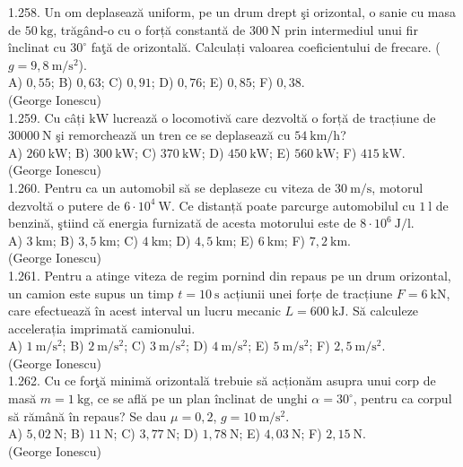 {1.258. Un om deplasează uniform, pe un drum drept şi orizontal, o sanie cu masa de $50 \mathrm{~kg}$, trăgând-o cu o forță constantă de $300 \mathrm{~N}$ prin intermediul unui fir înclinat cu $30^{\circ}$ faţă de orizontală. Calculați valoarea coeficientului de frecare. ($g=9,8 \mathrm{~m} / \mathrm{s}^{2}$).\\ A) $0,55$; B) $0,63$; C) $0,91$; D) $0,76$; E) $0,85$; F) $0,38$.\\ (George Ionescu)\\

1.259. Cu câți $\mathrm{kW}$ lucrează o locomotivă care dezvoltă o forță de tracțiune de $30000 \mathrm{~N}$ şi remorchează un tren ce se deplasează cu $54 \mathrm{~km} / \mathrm{h}$?\\ A) $260 \mathrm{~kW}$; B) $300 \mathrm{~kW}$; C) $370 \mathrm{~kW}$; D) $450 \mathrm{~kW}$; E) $560 \mathrm{~kW}$; F) $415 \mathrm{~kW}$.\\ (George Ionescu)\\

1.260. Pentru ca un automobil să se deplaseze cu viteza de $30 \mathrm{~m} / \mathrm{s}$, motorul dezvoltă o putere de $6 \cdot 10^{4} \mathrm{~W}$. Ce distanță poate parcurge automobilul cu $1 \mathrm{~l}$ de benzină, ştiind că energia furnizată de acesta motorului este de $8 \cdot 10^{6} \mathrm{~J} / \mathrm{l}$.\\ A) $3 \mathrm{~km}$; B) $3,5 \mathrm{~km}$; C) $4 \mathrm{~km}$; D) $4,5 \mathrm{~km}$; E) $6 \mathrm{~km}$; F) $7,2 \mathrm{~km}$.\\ (George Ionescu)\\

1.261. Pentru a atinge viteza de regim pornind din repaus pe un drum orizontal, un camion este supus un timp $t=10 \mathrm{~s}$ acțiunii unei forțe de tracțiune $F=6 \mathrm{~kN}$, care efectuează în acest interval un lucru mecanic $L=600 \mathrm{~kJ}$. Să calculeze accelerația imprimată camionului.\\ A) $1 \mathrm{~m} / \mathrm{s}^{2}$; B) $2 \mathrm{~m} / \mathrm{s}^{2}$; C) $3 \mathrm{~m} / \mathrm{s}^{2}$; D) $4 \mathrm{~m} / \mathrm{s}^{2}$; E) $5 \mathrm{~m} / \mathrm{s}^{2}$; F) $2,5 \mathrm{~m} / \mathrm{s}^{2}$.\\ (George Ionescu)\\

1.262. Cu ce forţă minimă orizontală trebuie să acționăm asupra unui corp de masă $m=1 \mathrm{~kg}$, ce se află pe un plan înclinat de unghi $\alpha=30^{\circ}$, pentru ca corpul să rămână în repaus? Se dau $\mu=0,2$, $g=10 \mathrm{~m} / \mathrm{s}^{2}$.\\ A) $5,02 \mathrm{~N}$; B) $11 \mathrm{~N}$; C) $3,77 \mathrm{~N}$; D) $1,78 \mathrm{~N}$; E) $4,03 \mathrm{~N}$; F) $2,15 \mathrm{~N}$.\\ (George Ionescu)\\

}
